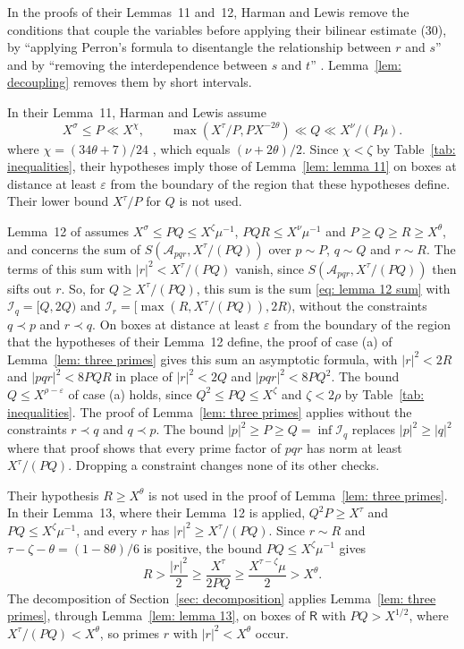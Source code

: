 \documentclass{article}
\numberwithin{equation}{section}
\newcommand{\Le}{\leqslant}
\newcommand{\Ge}{\geqslant}
\begin{document}
In the proofs of their Lemmas~11 and~12, Harman and Lewis remove the conditions that couple the variables before applying their bilinear estimate (30), by ``applying Perron's formula to disentangle the relationship between $r$ and $s$'' and by ``removing the interdependence between $s$ and $t$'' \citep[p.~130]{harman2001gaussian}. Lemma~\ref{lem: decoupling} removes them by short intervals.

In their Lemma~11, Harman and Lewis assume
\begin{equation*}
X^{\sigma} \Le P \ll X^{\chi}, \qquad \max(X^{\tau}/P, PX^{-2\theta}) \ll Q \ll X^{\nu}/(P\mu).
\end{equation*}
where $\chi = (34\theta + 7)/24$ \citep[p.~120]{harman2001gaussian}, which equals $(\nu + 2\theta)/2$. Since $\chi < \zeta$ by Table~\ref{tab: inequalities}, their hypotheses imply those of Lemma~\ref{lem: lemma 11} on boxes at distance at least $\varepsilon$ from the boundary of the region that these hypotheses define. Their lower bound $X^{\tau}/P$ for $Q$ is not used.

Lemma~12 of \citet{harman2001gaussian} assumes $X^{\sigma} \Le PQ \Le X^{\zeta}\mu^{-1}$, $PQR \Le X^{\nu}\mu^{-1}$ and $P \Ge Q \Ge R \Ge X^{\theta}$, and concerns the sum of $S(\mathcal{A}_{pqr}, X^{\tau}/(PQ))$ over $p \sim P$, $q \sim Q$ and $r \sim R$. The terms of this sum with $|r|^2 < X^{\tau}/(PQ)$ vanish, since $S(\mathcal{A}_{pqr}, X^{\tau}/(PQ))$ then sifts out $r$. So, for $Q \Ge X^{\tau}/(PQ)$, this sum is the sum \eqref{eq: lemma 12 sum} with $\mathcal{I}_q = [Q, 2Q)$ and $\mathcal{I}_r = [\max(R, X^{\tau}/(PQ)), 2R)$, without the constraints $q \prec p$ and $r \prec q$. On boxes at distance at least $\varepsilon$ from the boundary of the region that the hypotheses of their Lemma~12 define, the proof of case (a) of Lemma~\ref{lem: three primes} gives this sum an asymptotic formula, with $|r|^2 < 2R$ and $|pqr|^2 < 8PQR$ in place of $|r|^2 < 2Q$ and $|pqr|^2 < 8PQ^2$. The bound $Q \Le X^{\rho - \varepsilon}$ of case (a) holds, since $Q^2 \Le PQ \Le X^{\zeta}$ and $\zeta < 2\rho$ by Table~\ref{tab: inequalities}. The proof of Lemma~\ref{lem: three primes} applies without the constraints $r \prec q$ and $q \prec p$. The bound $|p|^2 \Ge P \Ge Q = \inf \mathcal{I}_q$ replaces $|p|^2 \Ge |q|^2$ where that proof shows that every prime factor of $pqr$ has norm at least $X^{\tau}/(PQ)$. Dropping a constraint changes none of its other checks.

Their hypothesis $R \Ge X^{\theta}$ is not used in the proof of Lemma~\ref{lem: three primes}. In their Lemma~13, where their Lemma~12 is applied, $Q^2P \Ge X^{\tau}$ and $PQ \Le X^{\zeta}\mu^{-1}$, and every $r$ has $|r|^2 \Ge X^{\tau}/(PQ)$. Since $r \sim R$ and $\tau - \zeta - \theta = (1 - 8\theta)/6$ is positive, the bound $PQ \Le X^{\zeta}\mu^{-1}$ gives
\begin{equation*}
R > \frac{|r|^2}{2} \Ge \frac{X^{\tau}}{2PQ} \Ge \frac{X^{\tau - \zeta}\mu}{2} > X^{\theta}.
\end{equation*} The decomposition of Section~\ref{sec: decomposition} applies Lemma~\ref{lem: three primes}, through Lemma~\ref{lem: lemma 13}, on boxes of $\mathsf{R}$ with $PQ > X^{1/2}$, where $X^{\tau}/(PQ) < X^{\theta}$, so primes $r$ with $|r|^2 < X^{\theta}$ occur.
\end{document}
